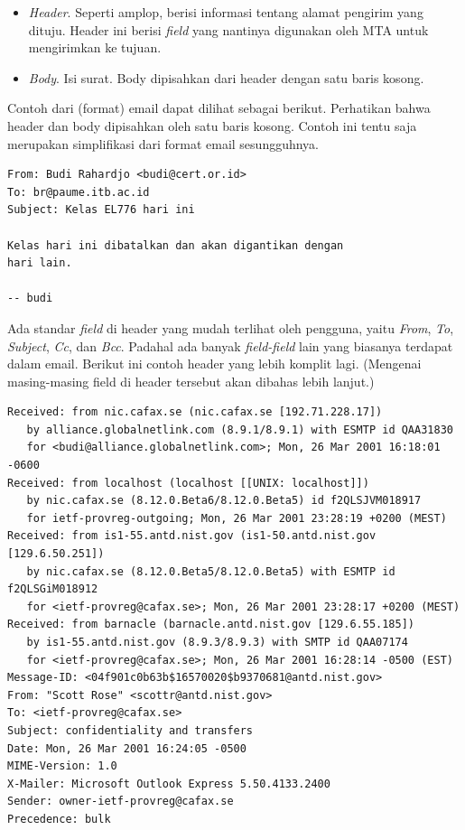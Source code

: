 \begin{itemize}
   \item {\em Header}. Seperti amplop, berisi informasi tentang alamat pengirim
      yang dituju. Header ini berisi {\em field} yang nantinya digunakan oleh
      MTA untuk mengirimkan ke tujuan.
   \item {\em Body}. Isi surat. Body dipisahkan dari header dengan satu baris
      kosong. 
\end{itemize}

Contoh dari (format) email dapat dilihat sebagai berikut. Perhatikan bahwa
header dan body dipisahkan oleh satu baris kosong. Contoh ini tentu saja
merupakan simplifikasi dari format email sesungguhnya.

\begin{mdframed}
\begin{verbatim}
From: Budi Rahardjo <budi@cert.or.id>
To: br@paume.itb.ac.id
Subject: Kelas EL776 hari ini

Kelas hari ini dibatalkan dan akan digantikan dengan
hari lain.

-- budi
\end{verbatim}
\end{mdframed}

Ada standar {\em field} di header yang mudah terlihat oleh pengguna, yaitu {\em
From}, {\em To}, {\em Subject}, {\em Cc}, dan {\em Bcc}. Padahal ada banyak
{\em field-field} lain yang biasanya terdapat dalam email. Berikut ini contoh
header yang lebih komplit lagi. (Mengenai masing-masing field di header
tersebut akan dibahas lebih lanjut.)

\begin{mdframed}
\begin{verbatim}
Received: from nic.cafax.se (nic.cafax.se [192.71.228.17])
   by alliance.globalnetlink.com (8.9.1/8.9.1) with ESMTP id QAA31830
   for <budi@alliance.globalnetlink.com>; Mon, 26 Mar 2001 16:18:01 -0600
Received: from localhost (localhost [[UNIX: localhost]])
   by nic.cafax.se (8.12.0.Beta6/8.12.0.Beta5) id f2QLSJVM018917
   for ietf-provreg-outgoing; Mon, 26 Mar 2001 23:28:19 +0200 (MEST)
Received: from is1-55.antd.nist.gov (is1-50.antd.nist.gov [129.6.50.251])
   by nic.cafax.se (8.12.0.Beta5/8.12.0.Beta5) with ESMTP id f2QLSGiM018912
   for <ietf-provreg@cafax.se>; Mon, 26 Mar 2001 23:28:17 +0200 (MEST)
Received: from barnacle (barnacle.antd.nist.gov [129.6.55.185])
   by is1-55.antd.nist.gov (8.9.3/8.9.3) with SMTP id QAA07174
   for <ietf-provreg@cafax.se>; Mon, 26 Mar 2001 16:28:14 -0500 (EST)
Message-ID: <04f901c0b63b$16570020$b9370681@antd.nist.gov>
From: "Scott Rose" <scottr@antd.nist.gov>
To: <ietf-provreg@cafax.se>
Subject: confidentiality and transfers
Date: Mon, 26 Mar 2001 16:24:05 -0500
MIME-Version: 1.0
X-Mailer: Microsoft Outlook Express 5.50.4133.2400
Sender: owner-ietf-provreg@cafax.se
Precedence: bulk
\end{verbatim}
\end{mdframed}

